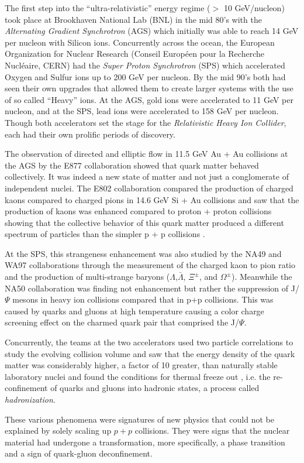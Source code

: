 The first step into the ``ultra-relativistic'' energy regime ($>$ 10 GeV/nucleon) took place at Brookhaven National Lab (BNL) in the mid 80's with the \textit{Alternating Gradient Synchrotron} (AGS) which initially was able to reach 14 GeV per nucleon with Silicon ions. Concurrently across the ocean, the European Organization for Nuclear Research (Conseil Européen pour la Recherche Nucl\'{e}aire, CERN) had the \textit{Super Proton Synchrotron} (SPS) which accelerated Oxygen and Sulfur ions up to 200 GeV per nucleon. By the mid 90's both had seen their own upgrades that allowed them to create larger systems with the use of so called ``Heavy'' ions. At the AGS, gold ions were accelerated to 11 GeV per nucleon, and at the SPS, lead ions were accelerated to 158 GeV per nucleon\citep{wojciechphenomenology}. Though both accelerators set the stage for the \textit{Relativistic Heavy Ion Collider}, each had their own prolific periods of discovery. 

The observation of directed and elliptic flow in 11.5 GeV Au + Au collisions at the AGS by the E877 collaboration \citep{Barrette:1999rx} showed that quark matter behaved collectively. It was indeed a new state of matter and not just a conglomerate of independent nuclei. The E802 collaboration compared the production of charged kaons compared to charged pions in 14.6 GeV Si + Au collisions and saw that the production of kaons was enhanced compared to proton + proton collisions showing that the collective behavior of this quark matter produced a different spectrum of particles than the simpler p + p collisions \citep{PhysRevLett.64.847}. 

At the SPS, this strangeness enhancement was also studied by the NA49\citep{Hohne:1999jf} and WA97 collaborations through the measurement of the charged kaon to pion ratio and the production of multi-strange baryons ($\Lambda$,$\bar{\Lambda}$, $\Xi^{\pm}$, and $\Omega^{\pm}$). Meanwhile the NA50 collaboration was finding not enhancement but rather the suppression of J/$\Psi$ mesons in heavy ion collisions compared that in p+p collisions\citep{Abreu:2000ni}. This was caused by quarks and gluons at high temperature causing a color charge screening effect on the charmed quark pair that comprised the J/$\Psi$.

Concurrently, the teams at the two accelerators used two particle correlations to study the evolving collision volume and saw that the energy density of the quark matter was considerably higher, a factor of 10 greater, than naturally stable laboratory nuclei \citep{Heinz:1999rw} and found the conditions for thermal freeze out \citep{BraunMunzinger:1998cg}, i.e. the re-confinement of quarks and gluons into hadronic states, a process called \textit{hadronization}.

These various phenomena were signatures of new physics that could not be explained by solely scaling up $p+p$ collisions. They were signs that the nuclear material had undergone a transformation, more specifically, a phase transition and a sign of quark-gluon deconfinement. 
\pagebreak
\pagebreak
